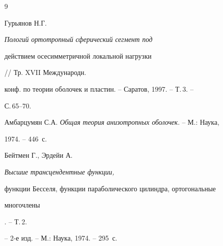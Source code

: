 \begin{thebibliography}{9} 


 




Гурьянов Н.Г. {\em Пологий ортотропный сферический сегмент под 


действием осесимметричной локальной нагрузки} // Тр. XVII Международн. 


конф. по теории оболочек и пластин. -- Саратов, 1997. -- Т.\,3. -- 


С.\,65--70. 




Амбарцумян С.А. {\em Общая теория анизотропных оболочек}. -- М.: Наука, 


1974. -- 446~с. 




Бейтмен Г., Эрдейи А. {\em Высшие трансцендентные функции,


функции Бесселя, функции параболического цилиндра, ортогональные


многочлены}. -- Т.\,2. 


-- 2-е изд. -- М.: Наука, 1974. -- 295~с. 


 


\end{thebibliography} 


 


\vskip 2cm 


 






 


\label{end} 


 


